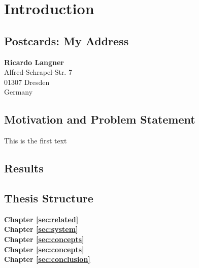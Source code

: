 %
\chapter{Introduction}
\label{sec:intro}




\section{Postcards: My Address}
\label{sec:intro:address}

\textbf{Ricardo Langner} \\
Alfred-Schrapel-Str. 7 \\
01307 Dresden \\
Germany


\section{Motivation and Problem Statement}
\label{sec:intro:motivation}


This is the first text


\section{Results}
\label{sec:intro:results}






\section{Thesis Structure}
\label{sec:intro:structure}

\textbf{Chapter \ref{sec:related}} \\[0.2em]


\textbf{Chapter \ref{sec:system}} \\[0.2em]


\textbf{Chapter \ref{sec:concepts}} \\[0.2em]


\textbf{Chapter \ref{sec:concepts}} \\[0.2em]


\textbf{Chapter \ref{sec:conclusion}} \\[0.2em]

